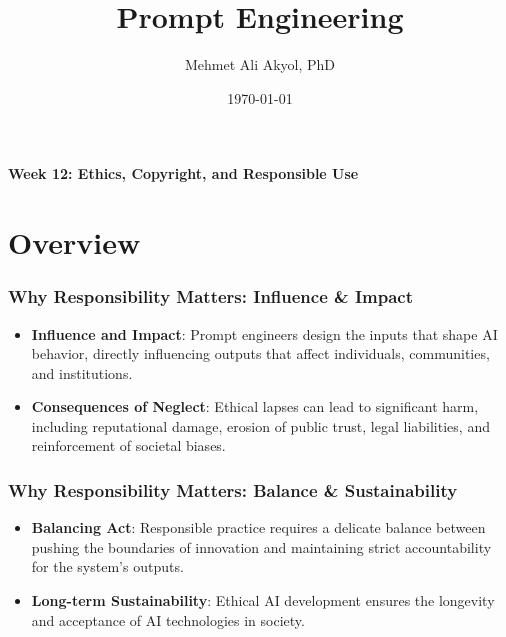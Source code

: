 \documentclass{beamer}
\title{Prompt Engineering}
\author{Mehmet Ali Akyol, PhD}
\institute{Ankara Medipol University}
\date{\today}
\begin{document}
\begin{frame}
    \titlepage
    \begin{center}
        \vspace{1cm}
        \textbf{Week 12: Ethics, Copyright, and Responsible Use}
    \end{center}
\end{frame}

\section{Overview}

\begin{frame}
    \frametitle{Why Responsibility Matters: Influence \& Impact}
    \begin{itemize}
        \item \textbf{Influence and Impact}: Prompt engineers design the inputs that shape AI behavior, directly influencing outputs that affect individuals, communities, and institutions.
        \item \textbf{Consequences of Neglect}: Ethical lapses can lead to significant harm, including reputational damage, erosion of public trust, legal liabilities, and reinforcement of societal biases.
    \end{itemize}
\end{frame}

\begin{frame}
    \frametitle{Why Responsibility Matters: Balance \& Sustainability}
    \begin{itemize}
        \item \textbf{Balancing Act}: Responsible practice requires a delicate balance between pushing the boundaries of innovation and maintaining strict accountability for the system's outputs.
        \item \textbf{Long-term Sustainability}: Ethical AI development ensures the longevity and acceptance of AI technologies in society.
    \end{itemize}
\end{frame}
\end{document}
